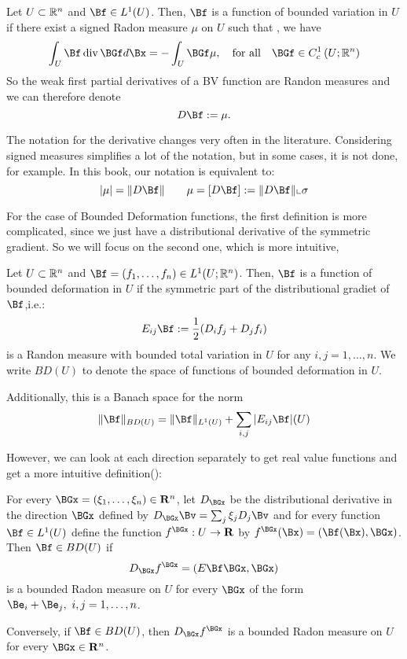 \begin{definition} Let $U\subset\mathbb{R}^n$ and $\Bf \in L^1(U)$. Then, $\Bf$ is a function of bounded variation in $U$ if there exist a signed Radon measure $\mu$ on $U$  such that , we have
    $$
    \int_U \Bf \operatorname{div} \BGf d \Bx=-\int_U  \BGf \mu,\quad \text{for all}\quad \BGf \in C_c^1\left(U ; \mathbb{R}^n\right)
    $$
    So the weak first partial derivatives of a BV function are Randon measures and we can therefore denote
    $$D \Bf:=\mu.$$
\end{definition}
    
\begin{remark}
    The notation for the derivative changes very often in the literature. Considering signed measures simplifies a lot of the notation, but in some cases, it is not done, \cite{evansGa} for example. In this book, our notation is equivalent to:
    $$|\mu|=\|D\Bf\|\qquad \mu = [D \Bf]:=\|D \Bf\|\llcorner\sigma$$
\end{remark}
For the case of Bounded Deformation functions, the first definition is more complicated, since we just have a distributional derivative of the symmetric gradient. So we will focus on the second one, which is more intuitive, \cite{Ambrosio1997}
\begin{definition}
Let $U\subset\mathbb{R}^n$ and $\Bf=(f_1,       \ldots,f_n) \in L^1(U;\R^n)$. Then, $\Bf$ is a function of bounded deformation in $U$ if  the symmetric part of the distributional gradiet of $\Bf$,i.e.:
    $$E_{ij}\Bf:=\frac{1}{2}(D_{i} f_j+D_jf_i) $$
    is a Randon measure with bounded total variation in $U$ for any $i,j=1,\ldots,n$.
    We write  $B D(U)$   to denote the space of functions of bounded deformation in $U$. 
    
    Additionally, this is a Banach space for the norm
    $$\|\Bf\|_{BD(U)} = \|\Bf\|_{L^1(U)}+\sum_{i,j}|E_{ij}\Bf|(U)$$
\end{definition}

However,  we can look at each direction separately to get real value functions and get a more  intuitive definition(\cite[Definition 1.1]{RogerPaper}):
\begin{definition}
    For every $\BGx=\left(\xi_1, \ldots, \xi_n\right) \in \mathbf{R}^n$, let $D_{\BGx}$ be the distributional derivative in the direction $\BGx$ defined by $D_{\BGx} \Bv=\sum_j \xi_j D_j \Bv$ and  for every function $\Bf\in L^1(U)$ define the function $f^{\BGx}: U \rightarrow \mathbf{R}$ by $f^{\BGx}(\Bx)=(\Bf(\Bx), \BGx)$. Then $\Bf \in B D(U)$ if 
    $$
    D_{\BGx} f^{\BGx}=(E \Bf \BGx , \BGx)
    $$
     is a bounded Radon measure on $U$ for every $\BGx$ of the form $\Be_i+\Be_j,\  i, j=1, \ldots, n$.
     
    Conversely, if $\Bf \in B D(U)$, then $D_{\BGx} f^{\BGx}$ is a bounded Radon measure on $U$ for every $\BGx \in \mathbf{R}^n$.
\end{definition}


